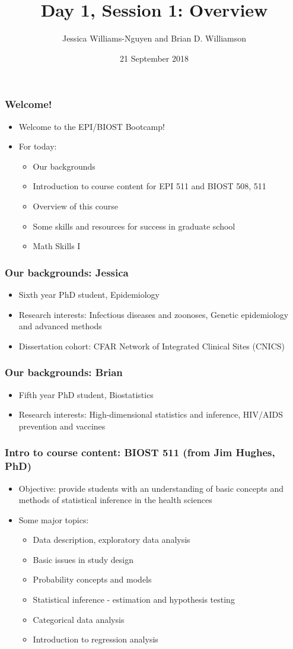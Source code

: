\documentclass[12pt]{beamer}
\title{Day 1, Session 1: Overview}
\author{Jessica Williams-Nguyen and Brian D. Williamson}
\institute{EPI/BIOST Bootcamp 2018}
\date{21 September 2018}
\newcommand{\myframe}[1]{\begin{frame} \frametitle{#1}}
\newenvironment{spaceitemize}
{ \begin{itemize}
    \setlength{\itemsep}{10pt}
    \setlength{\parskip}{0pt}
    \setlength{\parsep}{0pt}     }
{ \end{itemize}                  }
\begin{document}
\begin{frame}
\titlepage
\end{frame}

\myframe{Welcome!}
\begin{spaceitemize}
\item Welcome to the EPI/BIOST Bootcamp!
\item For today:
\begin{spaceitemize}
\item Our backgrounds
\item Introduction to course content for EPI 511 and BIOST 508, 511
\item Overview of this course
\item Some skills and resources for success in graduate school
\item Math Skills I
\end{spaceitemize}
\end{spaceitemize}
\end{frame}

\myframe{Our backgrounds: Jessica}
\begin{spaceitemize}
\item Sixth year PhD student, Epidemiology
\item Research interests: Infectious diseases and zoonoses, Genetic epidemiology and advanced methods
\item Dissertation cohort: CFAR Network of Integrated Clinical Sites (CNICS)
\end{spaceitemize}
\end{frame}

\myframe{Our backgrounds: Brian}
\centering
\begin{spaceitemize}
\item Fifth year PhD student, Biostatistics
\item Research interests: High-dimensional statistics and inference, HIV/AIDS prevention and vaccines
\end{spaceitemize}
\end{frame}

\myframe{Intro to course content: BIOST 511 \small (from Jim Hughes, PhD)}
\begin{spaceitemize}
\item Objective: provide students with an understanding of basic concepts and methods of statistical inference in the health sciences
\item Some major topics:
\begin{spaceitemize}
\item Data description, exploratory data analysis
\item Basic issues in study design
\item Probability concepts and models
\item Statistical inference - estimation and hypothesis testing
\item Categorical data analysis
\item Introduction to regression analysis
\end{spaceitemize}
\end{spaceitemize}
\end{frame}
\end{document}

